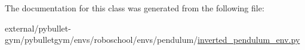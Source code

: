 The documentation for this class was generated from the following file\+:\begin{DoxyCompactItemize}
\item 
external/pybullet-\/gym/pybulletgym/envs/roboschool/envs/pendulum/\hyperlink{roboschool_2envs_2pendulum_2inverted__pendulum__env_8py}{inverted\+\_\+pendulum\+\_\+env.\+py}\end{DoxyCompactItemize}
